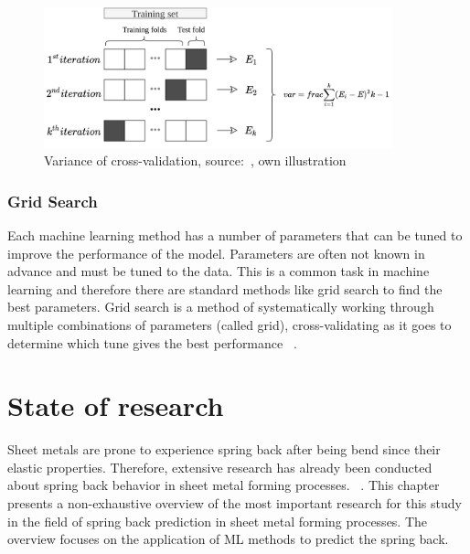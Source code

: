 \begin{figure}[h]
    \begin{tcolorbox}[arc=0pt,boxrule=0.5pt]
        \centering
        \includegraphics[trim=left botm right top, width=0.9\textwidth]
        {chap2/images/cross_validation}
        \caption{Variance of cross-validation, source:~\cite[p. 260]{muller_introductionmachinelearning_2016}, own
        illustration }
        \label{fig:cross-validation}
    \end{tcolorbox}
\end{figure}

\subsubsection{Grid Search}\label{subsubsec:grid-search}
Each machine learning method has a number of parameters that can be tuned to improve the
performance of the model.
Parameters are often not known in advance and must be tuned to the data.
This is a common task in machine learning and therefore there are standard methods like
grid search to find the best parameters.
Grid search is a method of systematically working through multiple combinations of
parameters (called grid), cross-validating as it goes to determine which tune gives the best
performance
~\cite[p. 260--275]{muller_introductionmachinelearning_2016}.


\section{State of research}\label{sec:state-of-research}
Sheet metals are prone to experience spring back after being bend since their elastic properties.
Therefore, extensive research has already been conducted about spring back behavior in sheet metal forming processes.
~\cite[p. 566]{liu2021deep}.
This chapter presents a non-exhaustive overview of the most important research for this study in the field of
spring back prediction in sheet metal forming processes.
The overview focuses on the application of \ac{ML} methods to predict the spring back.

